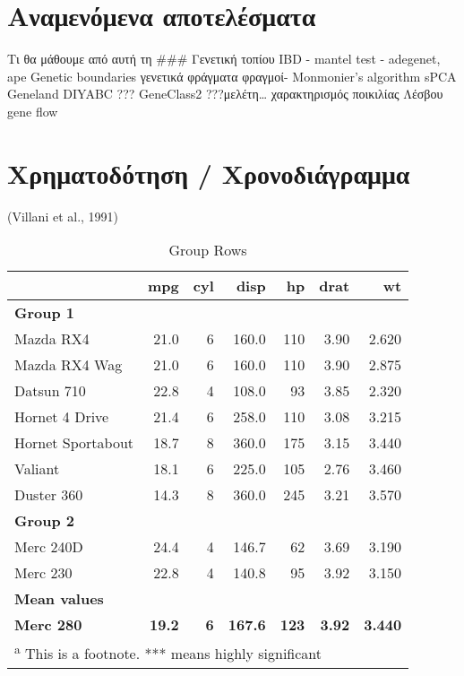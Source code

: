\documentclass[12pt,a4paper,]{report}
\begin{document}
\hypertarget{-}{%
\section{Αναμενόμενα αποτελέσματα}\label{-}}

Τι θα μάθουμε από αυτή τη \#\#\# Γενετική τοπίου IBD - mantel test -
adegenet, ape Genetic boundaries γενετικά φράγματα φραγμοί- Monmonier's
algorithm sPCA Geneland DIYABC ??? GeneClass2 ???μελέτη\ldots{}
χαρακτηρισμός ποικιλίας Λέσβου gene flow

\hypertarget{-}{%
\section{Χρηματοδότηση / Χρονοδιάγραμμα}\label{-}}

(Villani et al., 1991)

\begin{table}

\caption{\label{tab:unnamed-chunk-1}Group Rows}
\centering
\begin{tabular}[t]{l|r|r|r|r|r|r}
\hline
  & mpg & cyl & disp & hp & drat & wt\\
\hline
\multicolumn{7}{l}{\textbf{Group 1}}\\
\hline
\hspace{1em}Mazda RX4 & 21.0 & 6 & 160.0 & 110 & 3.90 & 2.620\\
\hline
\hspace{1em}Mazda RX4 Wag & 21.0 & 6 & 160.0 & 110 & 3.90 & 2.875\\
\hline
\hspace{1em}Datsun 710 & 22.8 & 4 & 108.0 & 93 & 3.85 & 2.320\\
\hline
\hspace{1em}Hornet 4 Drive & 21.4 & 6 & 258.0 & 110 & 3.08 & 3.215\\
\hline
\hspace{1em}Hornet Sportabout & 18.7 & 8 & 360.0 & 175 & 3.15 & 3.440\\
\hline
\hspace{1em}Valiant & 18.1 & 6 & 225.0 & 105 & 2.76 & 3.460\\
\hline
\hspace{1em}Duster 360 & 14.3 & 8 & 360.0 & 245 & 3.21 & 3.570\\
\hline
\multicolumn{7}{l}{\textbf{Group 2}}\\
\hline
\hspace{1em}Merc 240D & 24.4 & 4 & 146.7 & 62 & 3.69 & 3.190\\
\hline
\hspace{1em}Merc 230 & 22.8 & 4 & 140.8 & 95 & 3.92 & 3.150\\
\hline
\multicolumn{7}{l}{\textbf{Mean values}}\\
\hline
\textbf{\hspace{1em}Merc 280} & \textbf{19.2} & \textbf{6} & \textbf{167.6} & \textbf{123} & \textbf{3.92} & \textbf{3.440}\\
\hline
\multicolumn{7}{l}{\textsuperscript{a} This is a footnote. *** means highly significant}\\
\end{tabular}
\end{table}
\end{document}
